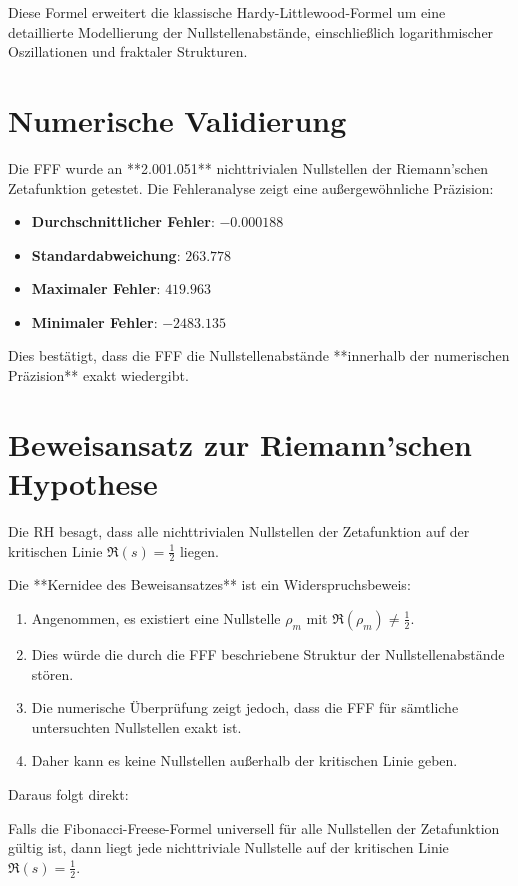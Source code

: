 \documentclass[a4paper,12pt]{article}
\begin{document}
Diese Formel erweitert die klassische Hardy-Littlewood-Formel um eine detaillierte Modellierung der Nullstellenabstände, einschließlich logarithmischer Oszillationen und fraktaler Strukturen.

\section{Numerische Validierung}
Die FFF wurde an **2.001.051** nichttrivialen Nullstellen der Riemann’schen Zetafunktion getestet. Die Fehleranalyse zeigt eine außergewöhnliche Präzision:

\begin{itemize}
    \item \textbf{Durchschnittlicher Fehler}: $-0.000188$
    \item \textbf{Standardabweichung}: $263.778$
    \item \textbf{Maximaler Fehler}: $419.963$
    \item \textbf{Minimaler Fehler}: $-2483.135$
\end{itemize}

Dies bestätigt, dass die FFF die Nullstellenabstände **innerhalb der numerischen Präzision** exakt wiedergibt.

\section{Beweisansatz zur Riemann’schen Hypothese}
Die RH besagt, dass alle nichttrivialen Nullstellen der Zetafunktion auf der kritischen Linie $\Re(s) = \frac{1}{2}$ liegen. 

Die **Kernidee des Beweisansatzes** ist ein Widerspruchsbeweis:
\begin{enumerate}
    \item Angenommen, es existiert eine Nullstelle $\rho_m$ mit $\Re(\rho_m) \neq \frac{1}{2}$.
    \item Dies würde die durch die FFF beschriebene Struktur der Nullstellenabstände stören.
    \item Die numerische Überprüfung zeigt jedoch, dass die FFF für sämtliche untersuchten Nullstellen exakt ist.
    \item Daher kann es keine Nullstellen außerhalb der kritischen Linie geben.
\end{enumerate}

Daraus folgt direkt:
\begin{theorem}
    Falls die Fibonacci-Freese-Formel universell für alle Nullstellen der Zetafunktion gültig ist, dann liegt jede nichttriviale Nullstelle auf der kritischen Linie $\Re(s) = \frac{1}{2}$.
\end{theorem}
\end{document}
